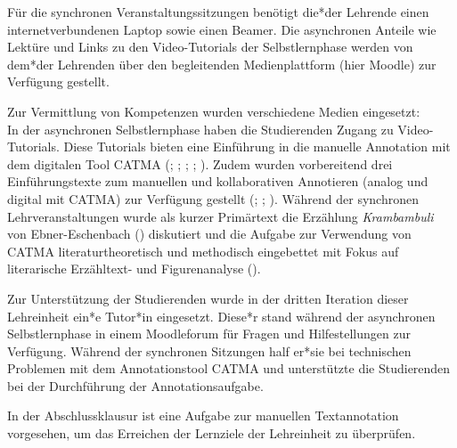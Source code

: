 \documentclass[
          a4paper,
        ]{article}
\begin{document}
Für die synchronen Veranstaltungssitzungen benötigt die*der Lehrende
einen internetverbundenen Laptop sowie einen Beamer. Die asynchronen
Anteile wie Lektüre und Links zu den Video-Tutorials der Selbstlernphase
werden von dem*der Lehrenden über den begleitenden Medienplattform (hier
Moodle) zur Verfügung gestellt.

Zur Vermittlung von Kompetenzen wurden verschiedene Medien eingesetzt:\\
In der asynchronen Selbstlernphase haben die Studierenden Zugang zu
Video-Tutorials. Diese Tutorials bieten eine Einführung in die manuelle
Annotation mit dem digitalen Tool CATMA
(;
;
;
;
). Zudem wurden
vorbereitend drei Einführungstexte zum manuellen und kollaborativen
Annotieren (analog und digital mit CATMA) zur Verfügung gestellt
(;
;
). Während der synchronen Lehrveranstaltungen wurde als kurzer
Primärtext die Erzählung \emph{Krambambuli} von Ebner-Eschenbach
() diskutiert und
die Aufgabe zur Verwendung von CATMA literaturtheoretisch und methodisch
eingebettet mit Fokus auf literarische Erzähltext- und Figurenanalyse
().

Zur Unterstützung der Studierenden wurde in der dritten Iteration dieser
Lehreinheit ein*e Tutor*in eingesetzt. Diese*r stand während der
asynchronen Selbstlernphase in einem Moodleforum für Fragen und
Hilfestellungen zur Verfügung. Während der synchronen Sitzungen half
er*sie bei technischen Problemen mit dem Annotationstool CATMA und
unterstützte die Studierenden bei der Durchführung der
Annotationsaufgabe.

In der Abschlussklausur ist eine Aufgabe zur manuellen Textannotation
vorgesehen, um das Erreichen der Lernziele der Lehreinheit zu
überprüfen.
\end{document}
